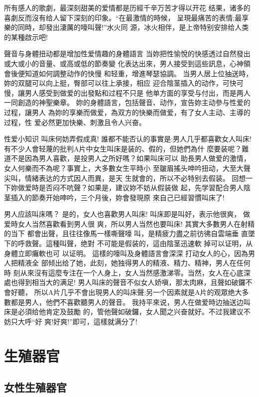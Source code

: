 \documentclass[12pt,UTF8]{ctexbook}
\begin{document}
所有感人的歌劇，最深刻甜美的爱情都是历經千辛万苦才得以开花
结果，诸多的喜劇反而沒有给人留下深刻的印象。“在最激情的時候，
呈現最痛苦的表情;最享樂的同時，却發出淒厲的嚎叫聲!”水火同
源，冰火相伴，是上帝特别安排给人类的某種啟示吧!

聲音与身體扭动都是增加性爱情趣的身體語言
当妳把性愉悅的快感透过自然發出或大或小的音量、或高或低的節奏變
化表达出來，男人接受到這些訊息，心神領會後便知道如何調整动作的快慢
和轻重，增進琴瑟協調。
当男人居上位抽送時，妳的双腿可以向上挺，臀部可以往上承接，相应
迎合陰茎插入的动作，可快可慢，讓男人感受到做爱的出發點和过程不只是
他单方面的享受与付出，而是两人一同創造的神聖樂章。
妳的身體語言，包括聲音、动作，宣告妳主动參与性爱的过程，讓男人
為妳的享樂而做爱，為双方的快樂而做爱，有了女人主动、主導的过程，性
爱必然更加快樂、刺激且令人兴奋。

性爱小知识
叫床何妨弄假成真!
誰都不能否认的事實是:男人几乎都喜歡女人叫床!
有不少人會轻蔑的批判A片中女生叫床是装的、假的，但她們為什
麼要装呢？難道不是因為男人喜歡，是投男人之所好嗎？如果叫床可以
助長男人做爱的激情，女人何樂而不為呢？事實上，大多數女生平時小
至皺眉搖头呻吟扭动，大至大聲尖叫，情緒表达的方式因人而異，是天
生就會的，所以不必特别去假装。
回想一下妳做爱時是否闷不吭聲？如果是，建议妳不妨从假装做
起，先学習配合男人陰茎插入的節奏开始呻吟，三个月後，妳會發現原
來自己已經習慣叫床了!

男人应該叫床嗎？
是的，女人也喜歡男人叫床!
叫床即是叫好，表示他很爽，
做爱時女人当然喜歡看到男人很
爽，所以男人当然也要叫床!
其實大多數男人在射精的当下
都會出聲，且往往像馬一樣嘶聲嚎
叫，是精疲力盡之前彷彿自雲端垂
直墜下的呼救聲。這種叫聲，绝對
不可能是假装的，這由陰茎迅速軟
掉可以证明，从身體立即癱軟也可
以证明。
這樣的嚎叫及身體語言會深深
打动女人的心，因為男人把精液全
部倾出给了她，此刻，她独得男人的精液、精力、精神，男人在任何時
刻从來沒有這麼专注在一个人身上，女人当然感激涕零。当然，女人在心底深處也得到相当大的满足!
男人叫床的聲音不似女人娇嗔，那太肉麻，且聲如破鑼不會好聽，
所以A片几乎不會出現男人的叫床聲;另一个因素就是A片的观眾绝大多
數都是男人，他們不喜歡聽男人的聲音。
我持平來说，男人在做爱時边抽送边叫床是必須给他肯定及鼓勵
的，管他聲如破鑼，女人聞之兴奋就好。不过我建议不妨只大呼“好
爽!好爽!”即可，這樣就满分了!

\mainmatter

\part{生殖器官}

\chapter{女性生殖器官}
\end{document}
